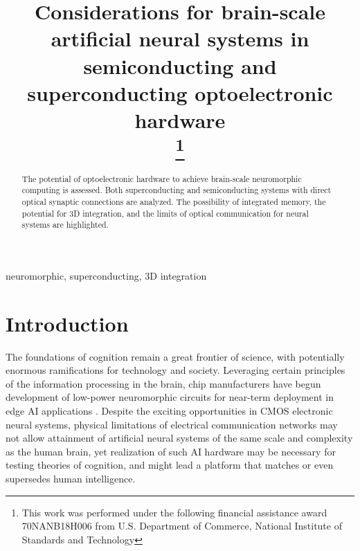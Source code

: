 \documentclass[conference]{IEEEtran}
\begin{document}
\title{Considerations for brain-scale artificial neural systems in semiconducting and superconducting optoelectronic hardware\\
\thanks{This work was performed under the following financial assistance award 70NANB18H006 from U.S. Department of Commerce, National Institute of Standards and Technology}
}


\author{
\and
{}
}


\maketitle

\begin{abstract}
The potential of optoelectronic hardware to achieve brain-scale neuromorphic computing is assessed. Both superconducting and semiconducting systems with direct optical synaptic connections are analyzed. The possibility of integrated memory, the potential for 3D integration, and the limits of optical communication for neural systems are highlighted.
\end{abstract}

\begin{IEEEkeywords}
neuromorphic, superconducting, 3D integration
\end{IEEEkeywords}

\section{Introduction}
The foundations of cognition remain a great frontier of science, with potentially enormous ramifications for technology and society. Leveraging certain principles of the information processing in the brain, chip manufacturers have begun development of low-power neuromorphic circuits for near-term deployment in edge AI applications \cite{merolla2014million, davies2018loihi}. Despite the exciting opportunities in CMOS electronic neural systems, physical limitations of electrical communication networks may not allow attainment of artificial neural systems of the same scale and complexity as the human brain, yet realization of such AI hardware may be necessary for testing theories of cognition, and might lead a platform that matches or even supersedes human intelligence.
\end{document}
